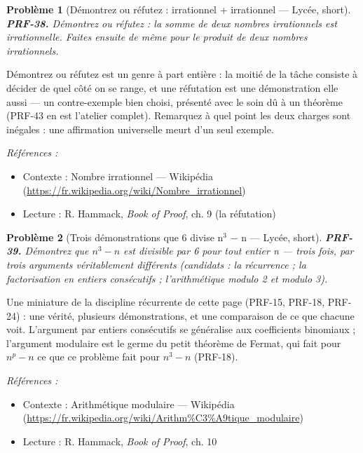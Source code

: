 \documentclass[11pt]{article}
\newtheorem{problem}{Problème}
\newenvironment{refs}{\par\small\noindent\emph{Références :}\begin{itemize}\setlength\itemsep{0pt}}{\end{itemize}\normalsize}
\begin{document}
\bigskip

\begin{problem}[{Démontrez ou réfutez : irrationnel + irrationnel --- Lycée, short}]
\textbf{PRF-38.} Démontrez ou réfutez : la somme de deux nombres
irrationnels est irrationnelle. Faites ensuite de même pour le produit de deux nombres
irrationnels.
\end{problem}

\noindent \og{} Démontrez ou réfutez \fg{} est un genre à part entière : la moitié de la
tâche consiste à décider de quel côté on se range, et une réfutation est une démonstration
elle aussi --- un contre-exemple bien choisi, présenté avec le soin dû à un théorème (PRF-43
en est l'atelier complet). Remarquez à quel point les deux charges sont inégales : une
affirmation universelle meurt d'un seul exemple.

\begin{refs}
\item Contexte : Nombre irrationnel --- Wikipédia (\url{https://fr.wikipedia.org/wiki/Nombre_irrationnel})
\item Lecture : R. Hammack, \textit{Book of Proof}, ch. 9 (la réfutation)
\end{refs}

\bigskip

\begin{problem}[{Trois démonstrations que 6 divise n$^3$ $-$ n --- Lycée, short}]
\textbf{PRF-39.} Démontrez que $ n^3 - n $ est divisible par 6 pour
tout entier n --- trois fois, par trois arguments véritablement différents (candidats : la
récurrence ; la factorisation en entiers consécutifs ; l'arithmétique modulo 2 et modulo
3).
\end{problem}

\noindent Une miniature de la discipline récurrente de cette page (PRF-15, PRF-18,
PRF-24) : une vérité, plusieurs démonstrations, et une comparaison de ce que chacune voit.
L'argument par entiers consécutifs se généralise aux coefficients binomiaux ; l'argument
modulaire est le germe du petit théorème de Fermat, qui fait pour $ n^p - n $ ce que ce
problème fait pour $ n^3 - n $ (PRF-18).

\begin{refs}
\item Contexte : Arithmétique modulaire --- Wikipédia (\url{https://fr.wikipedia.org/wiki/Arithm%C3%A9tique_modulaire})
\item Lecture : R. Hammack, \textit{Book of Proof}, ch. 10
\end{refs}
\end{document}
